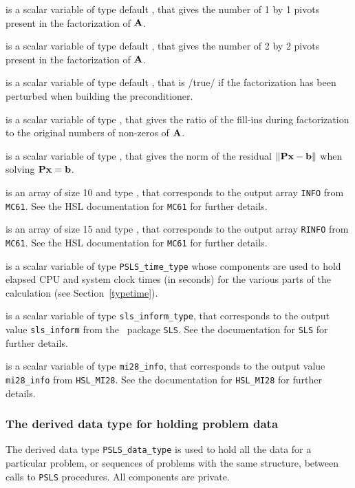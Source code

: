 \documentclass{galahad}
\newcommand{\packagename}{PSLS}
\begin{document}
\begin{description}
 is a scalar variable of type default \integer,
that gives the number of 1 by 1 pivots present in the factorization
of ${\mathbf{A}}$.

 is a scalar variable of type default \integer,
that gives the number of 2 by 2 pivots present in the factorization
of ${\mathbf{A}}$.

 is a scalar variable of type default \logical,
that is /true/ if the factorization has been perturbed when building the
preconditioner.

 is a scalar variable of type \realdp,
that gives the ratio of the fill-ins during factorization to the
original numbers of non-zeros of ${\mathbf{A}}$.

 is a scalar variable of type \realdp,
that gives the norm of the residual $\|{\mathbf{P}} {\mathbf{x}} - {\mathbf{b}}\|$
when solving ${\mathbf{P}} {\mathbf{x}} = {\mathbf{b}}$.

 is an array of size 10 and type \integer,
that corresponds to the output array {\tt INFO}
from {\tt MC61}. See the HSL documentation for {\tt MC61} for further
details.

 is an array of size 15 and type \realdp,
that corresponds to the output array {\tt RINFO}
from {\tt MC61}. See the HSL documentation for {\tt MC61} for further
details.

 is a scalar variable of type {\tt \packagename\_time\_type}
whose components are used to hold elapsed CPU and system clock times
(in seconds) for the various parts of the calculation
(see Section~\ref{typetime}).

 is a scalar variable of type {\tt sls\_inform\_type},
that corresponds to the output value {\tt sls\_inform} from the \libraryname\ 
package {\tt SLS}. See the documentation for {\tt SLS} for further details.

 is a scalar variable of type {\tt mi28\_info},
that corresponds to the output value {\tt mi28\_info}
from {\tt HSL\_MI28}. See the documentation for {\tt HSL\_MI28} for further
details.

\end{description}



\subsubsection{The derived data type for holding problem data}\label{typedata}
The derived data type
{\tt \packagename\_data\_type}
is used to hold all the data for a particular problem,
or sequences of problems with the same structure, between calls to
{\tt \packagename} procedures.
All components are private.
\end{document}
